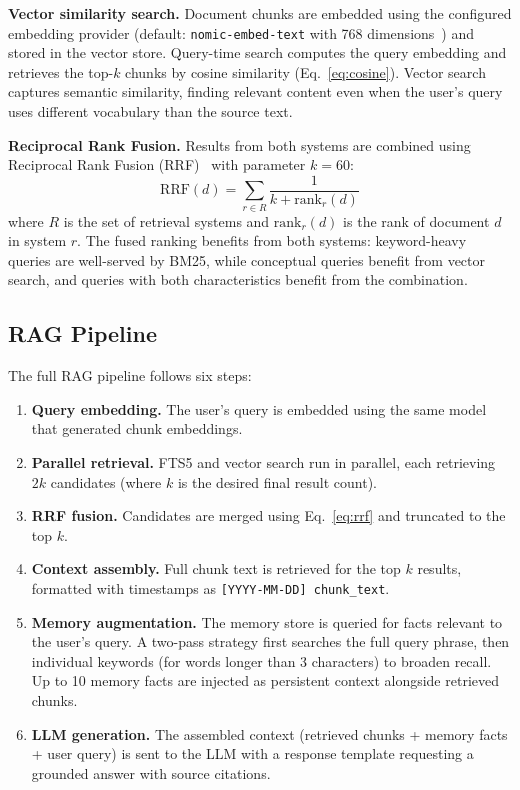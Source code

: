 \documentclass[manuscript,review]{acmart}
\begin{document}
\textbf{Vector similarity search.}
Document chunks are embedded using the configured embedding provider (default: \texttt{nomic-embed-text} with 768 dimensions~\cite{nussbaum2024nomic}) and stored in the vector store.
Query-time search computes the query embedding and retrieves the top-$k$ chunks by cosine similarity (Eq.~\ref{eq:cosine}).
Vector search captures semantic similarity, finding relevant content even when the user's query uses different vocabulary than the source text.

\textbf{Reciprocal Rank Fusion.}
Results from both systems are combined using Reciprocal Rank Fusion (RRF)~\cite{cormack2009rrf} with parameter $k=60$:
\begin{equation}
\text{RRF}(d) = \sum_{r \in R} \frac{1}{k + \text{rank}_r(d)}
\label{eq:rrf}
\end{equation}
where $R$ is the set of retrieval systems and $\text{rank}_r(d)$ is the rank of document $d$ in system $r$.
The fused ranking benefits from both systems: keyword-heavy queries are well-served by BM25, while conceptual queries benefit from vector search, and queries with both characteristics benefit from the combination.

\subsection{RAG Pipeline}
\label{sec:rag}

The full RAG pipeline follows six steps:

\begin{enumerate}
    \item \textbf{Query embedding.} The user's query is embedded using the same model that generated chunk embeddings.
    \item \textbf{Parallel retrieval.} FTS5 and vector search run in parallel, each retrieving $2k$ candidates (where $k$ is the desired final result count).
    \item \textbf{RRF fusion.} Candidates are merged using Eq.~\ref{eq:rrf} and truncated to the top $k$.
    \item \textbf{Context assembly.} Full chunk text is retrieved for the top $k$ results, formatted with timestamps as \texttt{[YYYY-MM-DD] chunk\_text}.
    \item \textbf{Memory augmentation.} The memory store is queried for facts relevant to the user's query. A two-pass strategy first searches the full query phrase, then individual keywords (for words longer than 3 characters) to broaden recall. Up to 10 memory facts are injected as persistent context alongside retrieved chunks.
    \item \textbf{LLM generation.} The assembled context (retrieved chunks + memory facts + user query) is sent to the LLM with a response template requesting a grounded answer with source citations.
\end{enumerate}
\end{document}
